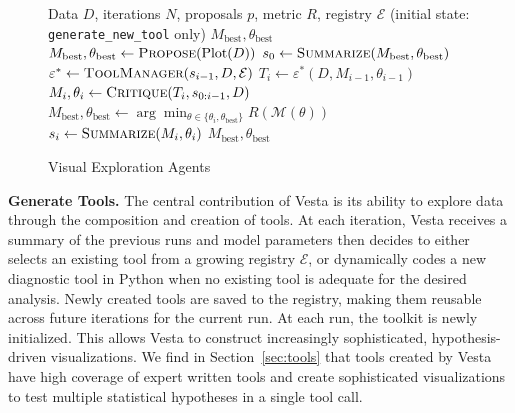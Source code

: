 \documentclass{article}
\newcommand\gd[1]{\todo[color=red!40]{{\bf Greg}: #1}}
\newcommand\jl[1]{\todo[color=blue!40]{{\bf Jessy}: #1}}
\newcommand{\method}{{\sc Vesta}}
\begin{document}

\begin{figure}
\vspace{-2.5em}
\begin{minipage}{0.58\textwidth}
\begin{algorithm}[H]
\caption{Visual Exploration Agents}
\label{alg:vea}
\begin{algorithmic}[1]
\Require Data $D$, iterations $N$, proposals $p$, metric $R$, registry $\mathcal{E}$ (initial state: \texttt{generate\_new\_tool} only)
\Ensure $M_{\text{best}}, \theta_{\text{best}}$
\State $M_{\text{best}}, \theta_{\text{best}} \gets \textsc{Propose}(\text{Plot}(D))$ 
\State $s_0 \gets \textsc{Summarize}(M_{\text{best}}, \theta_{\text{best}})$
    \State $\varepsilon^* \gets \textsc{ToolManager}(s_{i-1}, D, \mathcal{E})$ 
    \State $T_i \gets \varepsilon^*(D, M_{i-1}, \theta_{i-1})$ 
    \State $M_i, \theta_i \gets \textsc{Critique}(T_i, s_{0:i-1}, D)$ 
    \State $M_{\text{best}}, \theta_{\text{best}} \gets \arg\min_{\theta \in \{\theta_i, \theta_{\text{best}}\}} R(\mathcal{M}(\theta))$
    \State $s_i \gets \textsc{Summarize}(M_i, \theta_i)$
\EndFor
\State \Return $M_{\text{best}}, \theta_{\text{best}}$
\end{algorithmic}
\end{algorithm}
\end{minipage}
\vspace{-1em}
\end{figure}

\textbf{Generate Tools.} The central contribution of \method{} is its ability to explore data through the composition and creation of tools. At each iteration, \method{} receives a summary of the previous runs and model parameters then decides to either selects an existing tool from a growing registry $\mathcal{E}$, or dynamically codes a new diagnostic tool in Python when no existing tool is adequate for the desired analysis. 
Newly created tools are saved to the registry, making them reusable across future iterations for the current run. At each run, the toolkit is newly initialized. This allows \method{} to construct increasingly sophisticated, hypothesis-driven visualizations. 
We find in Section~\ref{sec:tools} that tools created by \method{} have high coverage of expert written tools and create sophisticated visualizations to test multiple statistical hypotheses in a single tool call. 
\end{document}
